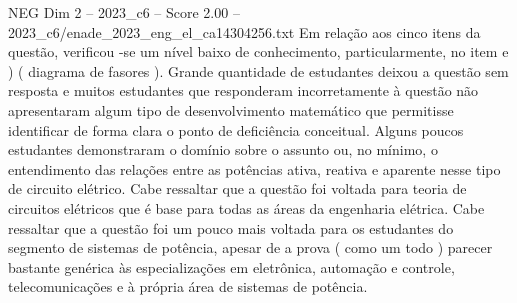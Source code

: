\begin{textsample}{NEG Dim 2 – 2023\_c6 – Score 2.00 – 2023\_c6/enade\_2023\_eng\_el\_ca14304256.txt}
Em relação aos cinco itens da questão, verificou -se um nível baixo de conhecimento, particularmente, no item e ) ( diagrama de fasores ).
Grande quantidade de estudantes deixou a questão sem resposta e muitos estudantes que responderam incorretamente à questão não apresentaram algum tipo de desenvolvimento matemático que permitisse identificar de forma clara o ponto de deficiência conceitual.
Alguns poucos estudantes demonstraram o domínio sobre o assunto ou, no mínimo, o entendimento das relações entre as potências ativa, reativa e aparente nesse tipo de circuito elétrico.
Cabe ressaltar que a questão foi voltada para teoria de circuitos elétricos que é base para todas as áreas da engenharia elétrica.
Cabe ressaltar que a questão foi um pouco mais voltada para os estudantes do segmento de sistemas de potência, apesar de a prova ( como um todo ) parecer bastante genérica às especializações em eletrônica, automação e controle, telecomunicações e à própria área de sistemas de potência.

\end{textsample}
